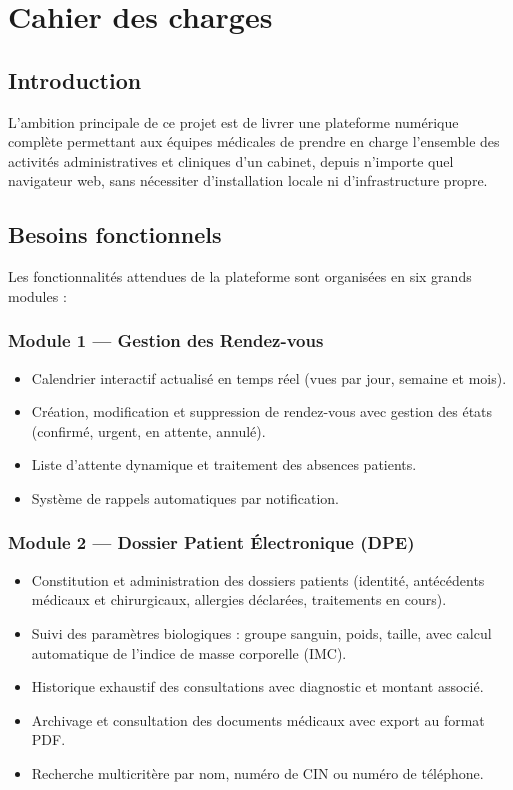 \section{Cahier des charges}

\subsection{Introduction}

L'ambition principale de ce projet est de livrer une plateforme numérique complète
permettant aux équipes médicales de prendre en charge l'ensemble des activités
administratives et cliniques d'un cabinet, depuis n'importe quel navigateur web,
sans nécessiter d'installation locale ni d'infrastructure propre.

\subsection{Besoins fonctionnels}

Les fonctionnalités attendues de la plateforme sont organisées en six grands modules :

\subsubsection*{Module 1 — Gestion des Rendez-vous}
\begin{itemize}
  \item Calendrier interactif actualisé en temps réel (vues par jour, semaine et mois).
  \item Création, modification et suppression de rendez-vous avec gestion
    des états (confirmé, urgent, en attente, annulé).
  \item Liste d'attente dynamique et traitement des absences patients.
  \item Système de rappels automatiques par notification.
\end{itemize}

\subsubsection*{Module 2 — Dossier Patient Électronique (DPE)}
\begin{itemize}
  \item Constitution et administration des dossiers patients (identité, antécédents
    médicaux et chirurgicaux, allergies déclarées, traitements en cours).
  \item Suivi des paramètres biologiques : groupe sanguin, poids, taille, avec
    calcul automatique de l'indice de masse corporelle (IMC).
  \item Historique exhaustif des consultations avec diagnostic et montant associé.
  \item Archivage et consultation des documents médicaux avec export au format PDF.
  \item Recherche multicritère par nom, numéro de CIN ou numéro de téléphone.
\end{itemize}

